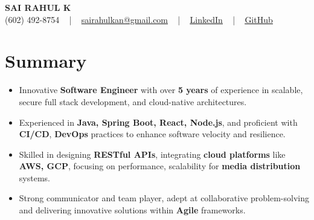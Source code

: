 \documentclass[letterpaper,11pt]{article}
\newcommand{\resumeItem}[1]{
  \item\footnotesize{
    {#1 \vspace{-2pt}}
  }
}
\newcommand{\resumeItemListStart}{\begin{itemize}[leftmargin=*]}
\newcommand{\resumeItemListEnd}{\end{itemize}\vspace{-5pt}}
\begin{document}
\begin{center}
    {\fontsize{14pt}{12pt}\selectfont \textbf{\MakeUppercase{Sai Rahul K}}}\\ \vspace{2pt}
    \fontsize{10pt}{12pt}\selectfont (602) 492-8754 ~ | ~ \href{mailto:sairahulkan@gmail.com}{sairahulkan@gmail.com} ~ | ~
    \href{https://www.linkedin.com/in/rq123/}{\color{blue}\underline{LinkedIn}} ~ | ~
    \href{https://github.com/kanrahuldo}{\color{blue}\underline{GitHub}}~
    \vspace{-8pt}
\end{center}

\section{Summary}
\fontsize{9pt}{10pt}\selectfont
\resumeItemListStart
    \resumeItem{Innovative \textbf{Software Engineer} with over \textbf{5 years} of experience in scalable, secure full stack development, and cloud-native architectures.} \vspace{-3pt}
    \resumeItem{Experienced in \textbf{Java, Spring Boot, React, Node.js}, and proficient with \textbf{CI/CD}, \textbf{DevOps} practices to enhance software velocity and resilience.} \vspace{-3pt}
    \resumeItem{Skilled in designing \textbf{RESTful APIs}, integrating \textbf{cloud platforms} like \textbf{AWS, GCP}, focusing on performance, scalability for \textbf{media distribution} systems.} \vspace{-3pt}
    \resumeItem{Strong communicator and team player, adept at collaborative problem-solving and delivering innovative solutions within \textbf{Agile} frameworks.} \vspace{-3pt}
\resumeItemListEnd
\vspace{-6pt}
\end{document}
